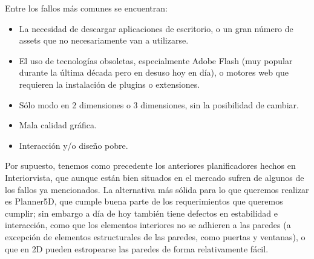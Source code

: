Entre los fallos más comunes se encuentran:
\begin{itemize}
    \item La necesidad de descargar aplicaciones de escritorio, o un gran número de assets que no necesariamente van a utilizarse.
    \item El uso de tecnologías obsoletas, especialmente Adobe Flash (muy popular durante la última década pero en desuso hoy en día), o motores web que requieren la instalación de plugins o extensiones.
    \item Sólo modo en 2 dimensiones o 3 dimensiones, sin la posibilidad de cambiar.
    \item Mala calidad gráfica.
    \item Interacción y/o diseño pobre.
\end{itemize}

Por supuesto, tenemos como precedente los anteriores planificadores hechos en Interiorvista, que aunque están bien situados en el mercado sufren de algunos de los fallos ya mencionados. La alternativa más sólida para lo que queremos realizar es Planner5D\cite{planner5d}, que cumple buena parte de los requerimientos que queremos cumplir; sin embargo a día de hoy también tiene defectos en estabilidad e interacción, como que los elementos interiores no se adhieren a las paredes (a excepción de elementos estructurales de las paredes, como puertas y ventanas), o que en 2D pueden estropearse las paredes de forma relativamente fácil.


